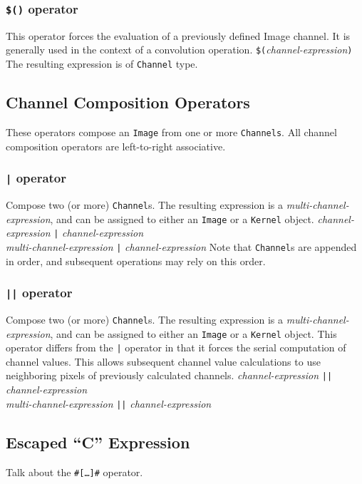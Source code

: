 \subsubsection{\texttt{\$()} operator}
\label{sssec:evalop}
This operator forces the evaluation of a previously defined Image channel. It
is generally used in the context of a convolution operation.
\startsyn
\texttt{\$(}\emph{channel-expression}\texttt{)}
\stopsyn
The resulting expression is of \texttt{Channel} type.

\subsection{Channel Composition Operators}
\label{ssec:channelops}
These operators compose an \texttt{Image} from one or more \texttt{Channels}.
All channel composition operators are left-to-right associative.

\subsubsection{\texttt{|} operator}
\label{sssec:barop}
Compose two (or more) \texttt{Channel}s. The resulting expression is a
\emph{multi-channel-expression}, and can be assigned to either an \texttt{Image}
or a \texttt{Kernel} object.
\startsyn
\emph{channel-expression} \texttt{|} \emph{channel-expression} \\
\emph{multi-channel-expression} \texttt{|} \emph{channel-expression}
\stopsyn
Note that \texttt{Channel}s are appended in order, and subsequent operations
may rely on this order.

\subsubsection{\texttt{||} operator}
\label{sssec:doublebarop}
Compose two (or more) \texttt{Channel}s. The resulting expression is a
\emph{multi-channel-expression}, and can be assigned to either an \texttt{Image}
or a \texttt{Kernel} object. This operator differs from the \texttt{|} operator in that
it forces the serial computation of channel values. This allows subsequent channel
value calculations to use neighboring pixels of previously calculated channels.
\startsyn
\emph{channel-expression} \texttt{||} \emph{channel-expression} \\
\emph{multi-channel-expression} \texttt{||} \emph{channel-expression}
\stopsyn

\subsection{Escaped ``C'' Expression}
\label{ssec:escapedC}
Talk about the \texttt{\#[\ldots]\#} operator.

